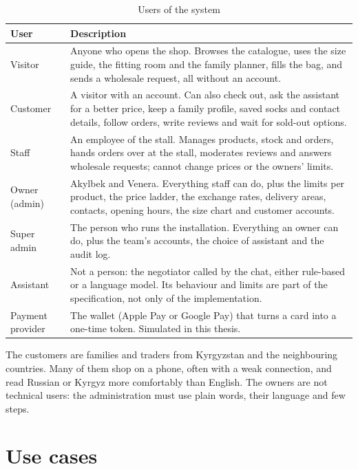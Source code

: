 \begin{table}[!htbp]
	\centering
	\begin{tabularx}{\textwidth}{l X}
		\toprule
		\textbf{User} & \textbf{Description} \\
		\midrule
		Visitor & Anyone who opens the shop. Browses the catalogue, uses the size guide, the fitting room and the family
		planner, fills the bag, and sends a wholesale request, all without an account. \\
		Customer & A visitor with an account. Can also check out, ask the assistant for a better price, keep a family
		profile, saved socks and contact details, follow orders, write reviews and wait for sold-out options. \\
		Staff & An employee of the stall. Manages products, stock and orders, hands orders over at the stall, moderates
		reviews and answers wholesale requests; cannot change prices or the owners' limits. \\
		Owner (admin) & Akylbek and Venera. Everything staff can do, plus the limits per product, the price ladder, the
		exchange rates, delivery areas, contacts, opening hours, the size chart and customer accounts. \\
		Super admin & The person who runs the installation. Everything an owner can do, plus the team's accounts, the
		choice of assistant and the audit log. \\
		Assistant & Not a person: the negotiator called by the chat, either rule-based or a language model. Its
		behaviour and limits are part of the specification, not only of the implementation. \\
		Payment provider & The wallet (Apple Pay or Google Pay) that turns a card into a one-time token. Simulated in this
		thesis. \\
		\bottomrule
	\end{tabularx}
	\caption{Users of the system}
	\label{tab:users}
\end{table}

The customers are families and traders from Kyrgyzstan and the neighbouring countries. Many of them shop on a phone,
often with a weak connection, and read Russian or Kyrgyz more comfortably than English. The owners are not technical
users: the administration must use plain words, their language and few steps.

\section{Use cases}

